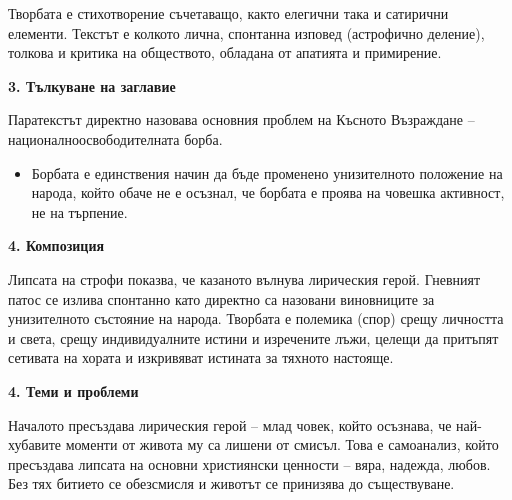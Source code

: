 \documentclass[12pt,a4paper]{article}
\begin{document}
\indent Творбата е стихотворение съчетаващо, както елегични така и сатирични елементи. Текстът е колкото лична, спонтанна изповед (астрофично деление), толкова и критика на обществото, обладана от апатията и примирение.

\vspace{0.1cm}

\textbf{3. Тълкуване на заглавие}
\vspace{0.1cm}
 
\indent Паратекстът директно назовава основния проблем на Късното Възраждане – националноосвободителната борба.

\vspace{0.1cm}

\begin{itemize}[leftmargin=*]
\vspace{-0.45cm}
\item Борбата е единствения начин да бъде променено унизителното положение на народа, който обаче не е осъзнал, че борбата е проява на човешка активност, не на търпение.
\end{itemize}

\textbf{4. Композиция}
\vspace{0.1cm}

\indent Липсата на строфи показва, че казаното вълнува лирическия герой. Гневният патос се излива спонтанно като директно са назовани виновниците за унизителното състояние на народа. Творбата е полемика (спор) срещу личността и света, срещу индивидуалните истини и изречените лъжи, целещи да притъпят сетивата на хората и изкривяват истината за тяхното настояще.

\vspace{0.1cm}

\textbf{4. Теми и проблеми}
\vspace{0.1cm}

\indent Началото пресъздава лирическия герой – млад човек, който осъзнава, че най-хубавите моменти от живота му са лишени от смисъл. Това е самоанализ, който пресъздава липсата на основни християнски ценности – вяра, надежда, любов. Без тях битието се обезсмисля и животът се принизява до съществуване.
\end{document}
